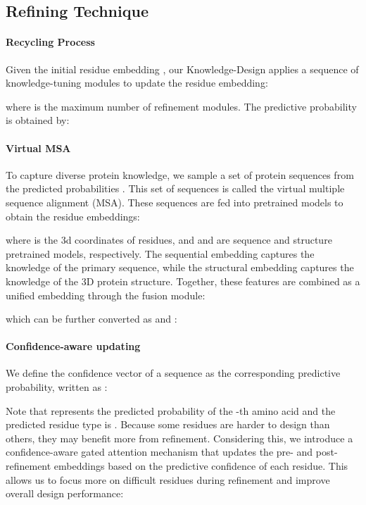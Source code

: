 \documentclass{article}
\begin{document}
\subsection{Refining Technique}
\label{sec:recycling}
\paragraph{Recycling Process} Given the initial residue embedding , our Knowledge-Design applies a sequence of knowledge-tuning modules to update the residue embedding:

where  is the maximum number of refinement modules. The predictive probability is obtained by:


\paragraph{Virtual MSA} To capture diverse protein knowledge, we sample a set of protein sequences  from the predicted probabilities . This set of sequences is called the virtual multiple sequence alignment (MSA). These sequences are fed into pretrained models to obtain the residue embeddings:
 
 where  is the 3d coordinates of residues, and  and  are sequence and structure pretrained models, respectively. The sequential embedding  captures the knowledge of the primary sequence, while the structural embedding  captures the knowledge of the 3D protein structure. Together, these features are combined as a unified embedding  through the fusion module:
 
which can be further converted as  and :




\paragraph{Confidence-aware updating} We define the confidence vector of a sequence  as the corresponding predictive probability, written as :

Note that  represents the predicted probability of the -th amino acid and the predicted residue type is . Because some residues are harder to design than others, they may benefit more from refinement. Considering this, we introduce a confidence-aware gated attention mechanism that updates the pre- and post-refinement embeddings based on the predictive confidence of each residue. This allows us to focus more on difficult residues during refinement and improve overall design performance:
\end{document}
